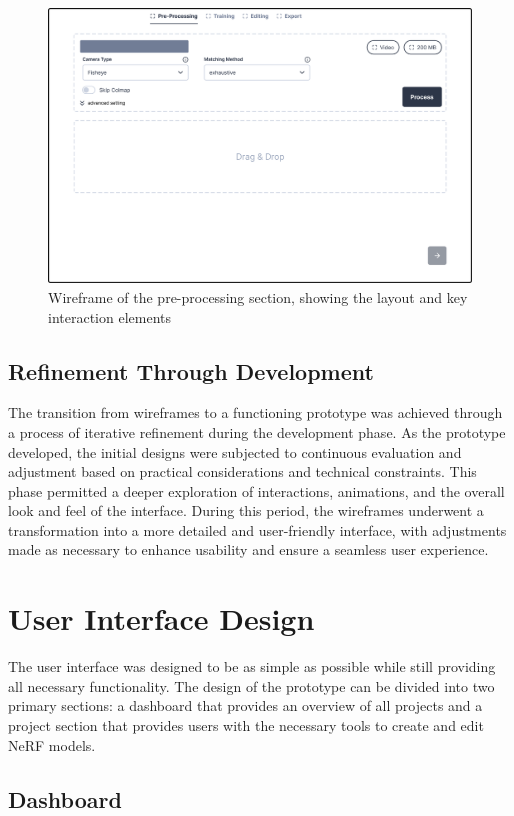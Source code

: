 \begin{figure}[h!]
  \centering
  \includegraphics[width=.8\textwidth]{figures/wireframe.png}
  \caption{Wireframe of the pre-processing section, showing the layout and key interaction elements}
  \label{fig:design:wireframe}
\end{figure}

\subsection*{Refinement Through Development}

The transition from wireframes to a functioning prototype was achieved through a process of iterative refinement during the development phase.
As the prototype developed, the initial designs were subjected to continuous evaluation and adjustment based on practical considerations and technical constraints.
This phase permitted a deeper exploration of interactions, animations, and the overall look and feel of the interface.
During this period, the wireframes underwent a transformation into a more detailed and user-friendly interface, with adjustments made as necessary to enhance usability and ensure a seamless user experience.

\section{User Interface Design}
The user interface was designed to be as simple as possible while still providing all necessary functionality.
The design of the prototype can be divided into two primary sections: a dashboard that provides an overview of all projects and a project section that provides users with the necessary tools to create and edit NeRF models.

\subsection*{Dashboard}

